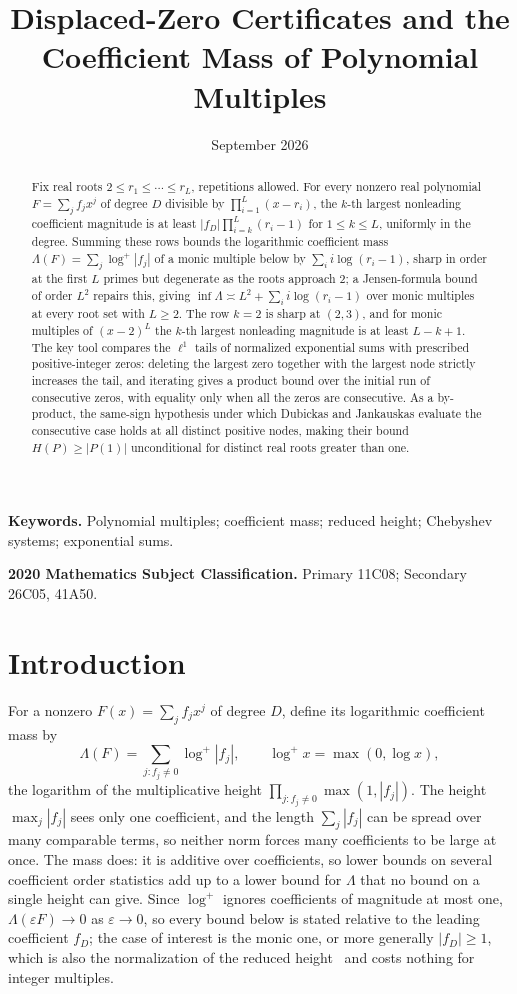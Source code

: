 \documentclass[11pt]{article}
\title{Displaced-Zero Certificates and the Coefficient Mass of Polynomial Multiples}
\author{\shortstack{Bangyen Pham\\
\small Independent Researcher\\
\small\href{mailto:bangyenp@gmail.com}{\texttt{bangyenp@gmail.com}}\\
\small\href{https://orcid.org/0009-0006-9928-2088}{ORCID: 0009-0006-9928-2088}}}
\date{September 2026}
\begin{document}
\maketitle

\begin{abstract}
Fix real roots $2\le r_1\le\cdots\le r_L$, repetitions allowed.  For every
nonzero real polynomial $F=\sum_jf_jx^j$ of degree $D$ divisible by
$\prod_{i=1}^L(x-r_i)$, the $k$-th largest nonleading coefficient
magnitude is at least $|f_D|\prod_{i=k}^L(r_i-1)$ for $1\le k\le L$,
uniformly in the degree.  Summing these rows bounds the logarithmic
coefficient mass $\Lambda(F)=\sum_j\log^+|f_j|$ of a monic multiple below by
$\sum_ii\log(r_i-1)$, sharp in order at the first $L$ primes but degenerate
as the roots approach $2$; a Jensen-formula bound of order $L^2$ repairs
this, giving $\inf\Lambda\asymp L^2+\sum_ii\log(r_i-1)$ over monic
multiples at every root set with $L\ge2$.  The row $k=2$ is
sharp at $(2,3)$, and for monic multiples of $(x-2)^L$ the $k$-th
largest nonleading magnitude is at least $L-k+1$.  The key tool compares the
$\ell^1$ tails of normalized exponential sums with prescribed
positive-integer zeros: deleting the largest zero together with the largest
node strictly increases the tail, and iterating gives a product bound over
the initial run of consecutive zeros, with equality only when all the zeros
are consecutive.  As a by-product, the same-sign hypothesis under which
Dubickas and Jankauskas evaluate the consecutive case holds at all distinct
positive nodes, making their bound $H(P)\ge|P(1)|$ unconditional for
distinct real roots greater than one.
\end{abstract}

\noindent\textbf{Keywords.} Polynomial multiples; coefficient mass; reduced
height; Chebyshev systems; exponential sums.

\noindent\textbf{2020 Mathematics Subject Classification.} Primary 11C08; Secondary 26C05, 41A50.

\section{Introduction}

For a nonzero $F(x)=\sum_jf_jx^j$ of degree $D$, define its logarithmic
coefficient mass by
\[
  \Lambda(F)=\sum_{j:f_j\ne0}\log^+|f_j|,
  \qquad \log^+x=\max(0,\log x),
\]
the logarithm of the multiplicative height $\prod_{j:f_j\ne0}\max(1,|f_j|)$.
The height $\max_j|f_j|$ sees only one coefficient, and the length
$\sum_j|f_j|$ can be spread over many comparable terms, so neither norm
forces many coefficients to be large at once.  The mass does: it is additive
over coefficients, so lower bounds on several coefficient order statistics
add up to a lower bound for $\Lambda$ that no bound on a single height can
give.  Since $\log^+$
ignores coefficients of magnitude at most one, $\Lambda(\varepsilon F)\to0$
as $\varepsilon\to0$, so every bound below is stated relative to the
leading coefficient $f_D$; the case of interest is the monic one, or more
generally $|f_D|\ge1$, which is also the normalization of the reduced
height~\cite{dj} and costs nothing for integer multiples.
\end{document}
